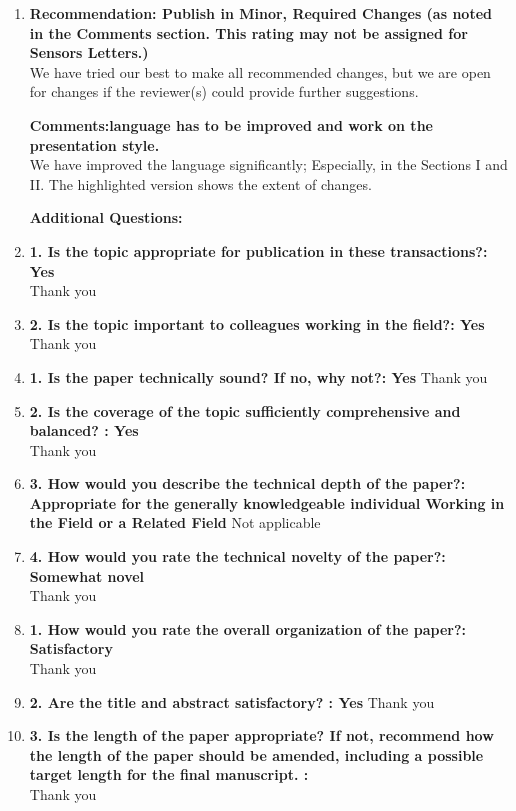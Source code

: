 \documentclass[11pt]{article}
\begin{document}
\begin{enumerate}
	\item \textbf{Recommendation: Publish in Minor, Required Changes (as noted in the Comments section. This rating may not be assigned for Sensors Letters.)
}\\
We have tried our best to make all recommended changes, but we are open for changes if the reviewer(s) could provide further suggestions.

\textbf{Comments:language has to be improved and work on the presentation style.
} \\
We have improved the language significantly; Especially, in the Sections I and II. The highlighted version shows the extent of changes.

\textbf{\textbf{Additional Questions:}}
\item\textbf{1. Is the topic appropriate for publication in these transactions?: Yes
}\\
Thank you

\item\textbf{2. Is the topic important to colleagues working in the field?: Yes}\\
Thank you

\item\textbf{1. Is the paper technically sound? If no, why not?: Yes}
Thank you

\item\textbf{2. Is the coverage of the topic sufficiently comprehensive and balanced? : Yes
}\\
Thank you

\item\textbf{3. How would you describe the technical depth of the paper?: Appropriate for the generally knowledgeable individual Working in the Field or a Related Field}
Not applicable

\item\textbf{4. How would you rate the technical novelty of the paper?: Somewhat novel}\\
Thank you

\item\textbf{1. How would you rate the overall organization of the paper?: Satisfactory}\\
Thank you

\item\textbf{2. Are the title and abstract satisfactory? : Yes}
Thank you

\item\textbf{3. Is the length of the paper appropriate? If not, recommend how the length of the paper should be amended, including a possible target length for the final manuscript. :}\\
Thank you



\end{enumerate}
\end{document}

